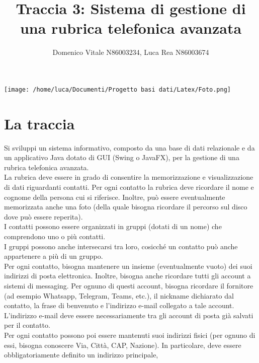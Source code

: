 \documentclass{article}
\begin{document}
    \author{Domenico Vitale N86003234, Luca Rea N86003674} 
    \title{\LARGE Traccia 3: Sistema di gestione di una rubrica telefonica avanzata}
    \maketitle

    \begin{center}
    \texttt{[image: /home/luca/Documenti/Progetto basi dati/Latex/Foto.png]}
    \end{center}

    \newpage
    \renewcommand\contentsname{Indice}
    \tableofcontents
    \newpage

    \section{\LARGE La traccia}
    Si sviluppi un sistema informativo, composto da una base di dati relazionale e da un applicativo Java dotato
    di GUI (Swing o JavaFX), per la gestione di una rubrica telefonica avanzata.
    \\La rubrica deve essere in grado di consentire la memorizzazione e visualizzazione di dati riguardanti contatti.
    Per ogni contatto la rubrica deve ricordare il nome e cognome della persona cui si riferisce. Inoltre, può essere
    eventualmente memorizzata anche una foto (della quale bisogna ricordare il percorso sul disco dove può
    essere reperita). \\I contatti possono essere organizzati in gruppi (dotati di un nome) che comprendono uno o più contatti.
    \\I gruppi possono anche intersecarsi tra loro, cosicché un contatto può anche appartenere a più di un gruppo.
    \\Per ogni contatto, bisogna mantenere un insieme (eventualmente vuoto) dei suoi indirizzi di posta
    elettronica. Inoltre, bisogna anche ricordare tutti gli account a sistemi di messaging. Per ognuno di questi
    account, bisogna ricordare il fornitore (ad esempio Whatsapp, Telegram, Teams, etc.), il nickname dichiarato
    dal contatto, la frase di benvenuto e l’indirizzo e-mail collegato a tale account. \\L’indirizzo e-mail deve essere
    necessariamente tra gli account di posta già salvati per il contatto.
    \\Per ogni contatto possono poi essere mantenuti suoi indirizzi fisici (per ognuno di essi, bisogna conoscere
    Via, Città, CAP, Nazione). In particolare, deve essere obbligatoriamente definito un indirizzo principale,
\end{document}
